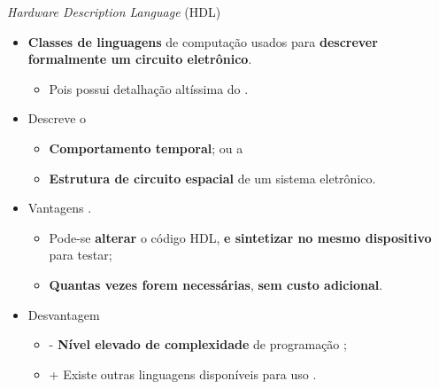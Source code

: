       \begin{frame}{\textit{Hardware Description Language} (HDL)} \vspace{-1em}
         \begin{itemize}
            \setlength{\itemsep}{1.0em}
            \item \textbf{Classes de linguagens} de computação usados para \textbf{descrever formalmente um circuito eletrônico}.
            \begin{itemize}
               \item Pois possui detalhação altíssima do \hardware.
            \end{itemize} 
            
            \item Descreve o \cite{Sass2010}
            
            \begin{itemize}
               \item \textbf{Comportamento temporal}; ou a 
               \item \textbf{Estrutura de circuito espacial} de um sistema eletrônico.
            \end{itemize}
         
            \item Vantagens \cite{Smith1998}. 
            \begin{itemize}
               \item Pode-se \textbf{alterar} o código HDL, \textbf{e sintetizar no mesmo dispositivo} para testar;
               \item \textbf{Quantas vezes forem necessárias}, \textbf{sem custo adicional}.
            \end{itemize}
            
            \item Desvantagem
            \begin{itemize}
               \item - \textbf{Nível elevado de complexidade} de programação  \cite{Choi2016};
               \item + Existe outras linguagens disponíveis para uso \cite{Sass2010}. 
            \end{itemize}
         \end{itemize}
      \end{frame}
   
